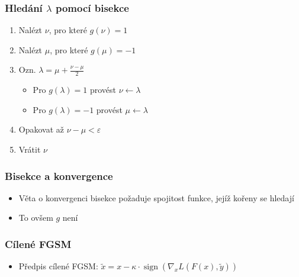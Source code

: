 \documentclass[czech]{beamer}
\begin{document}
\begin{frame}
    \frametitle{Hledání $\lambda$ pomocí bisekce}
    \begin{enumerate}
        \item Nalézt $\nu$, pro které $g(\nu) = 1$
        \item Nalézt $\mu$, pro které $g(\mu) = -1$
        \item Ozn. $\lambda = \mu + \frac{\nu - \mu}{2}$
        \begin{itemize}
            \item Pro $g(\lambda) = 1$ provést $\nu \leftarrow \lambda$
            \item Pro $g(\lambda) = -1$ provést $\mu \leftarrow \lambda$
        \end{itemize}
        \item Opakovat až $\nu - \mu < \varepsilon$
        \item Vrátit $\nu$
    \end{enumerate}
\end{frame}

\begin{frame}
    \frametitle{Bisekce a konvergence}
    \begin{itemize}
        \item Věta o konvergenci bisekce požaduje spojitost funkce, jejíž kořeny se hledají
        \item To ovšem $g$ není
    \end{itemize}
\end{frame}

\begin{frame}
    \frametitle{Cílené FGSM}
    \begin{itemize}
        \item Předpis cílené FGSM: $\tilde{x} = x - \kappa \cdot \operatorname{sign} \left( \nabla_x L(F(x), \tilde{y}) \right)$
    \end{itemize}
\end{frame}
\end{document}
